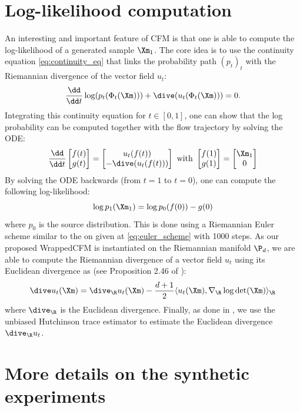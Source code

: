 \documentclass[10pt]{article} %
\theoremstyle{plain}
\theoremstyle{definition}
\theoremstyle{remark}
\begin{document}
\section{Log-likelihood computation}
\label{appendix:log_lik_est}
An interesting and important feature of CFM is that one is able to compute the log-likelihood of a generated sample $\Xm_1$. The core idea is to use the continuity equation \ref{eq:continuity_eq} that links the probability path $(p_t)_t$ with the Riemannian divergence of the vector field $u_t$:
$$\frac{\dd}{\dd t} \log(p_t(\Phi_t(\Xm))) + \dive(u_t(\Phi_t(\Xm))) = 0.$$
Integrating this continuity equation for $t \in [0,1]$, one can show that the log probability can be computed together with the flow trajectory by solving the ODE:
$$\frac{\dd}{\dd t}
\begin{bmatrix}
  f(t) \\ g(t)
\end{bmatrix} =
\begin{bmatrix}
  u_t(f(t)) \\ - \dive(u_t(f(t)))
\end{bmatrix} \text{ with }
\begin{bmatrix}
  f(1) \\ g(1)
\end{bmatrix} =
\begin{bmatrix}
  \Xm_1 \\ 0
\end{bmatrix}$$
By solving the ODE backwards (from $t = 1$ to $t = 0$), one can compute the following log-likelihood:
$$\log p_1(\Xm_1) = \log p_0 (f(0)) - g(0)$$
where $p_0$ is the source distribution. This is done using a Riemannian Euler scheme similar to the on given at \cref{eq:euler_scheme} with 1000 steps. As our proposed WrappedCFM is instantiated on the Riemannian manifold $\P_d$, we are able to compute the Riemannian divergence of a vector field $u_t$ using its Euclidean divergence as (see Proposition 2.46 of \citealt{leeIntroductionRiemannianManifolds2018}):
\begin{equation*}
  \dive u_t(\Xm) = \dive_{\R} u_t(\Xm) - \frac{d+1}{2} \langle u_t(\Xm), \nabla_{\R} \log \det (\Xm)\rangle_{\R}%
\end{equation*}
where $\dive_{\R}$ is the Euclidean divergence. Finally, as done in \cite{lipmanFlowMatchingGenerative2023}, we use the unbiased Hutchinson trace estimator \citep{hutchinson1989stochastic} to estimate the Euclidean divergence $\dive_{\R} u_t$.

\section{More details on the synthetic experiments}
\label{appendix:details_synthetic_experiments}
\end{document}
